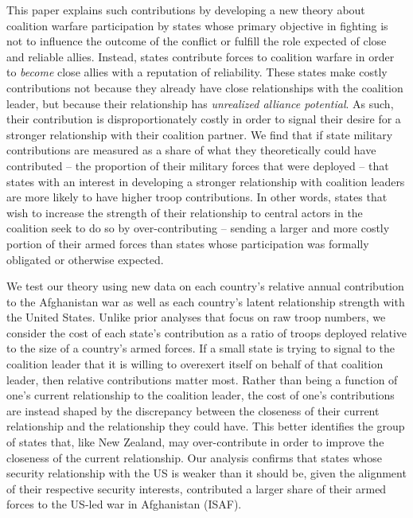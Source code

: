 \documentclass[12pt,letterpaper]{article}
\begin{document}
	This paper explains such contributions by developing a new theory about coalition warfare participation by states whose primary objective in fighting is not to influence the outcome of the conflict or fulfill the role expected of close and reliable allies. Instead, states contribute forces to coalition warfare in order to \textit{become} close allies with a reputation of reliability. These states make costly contributions not because they already have close relationships with the coalition leader, but because their relationship has \textit{unrealized alliance potential}. As such, their contribution is disproportionately costly in order to signal their desire for a stronger relationship with their coalition partner. We find that if state military contributions are measured as a share of what they theoretically could have contributed -- the proportion of their military forces that were deployed -- that states with an interest in developing a stronger relationship with coalition leaders are more likely to have higher troop contributions. In other words, states that wish to increase the strength of their relationship to central actors in the coalition seek to do so by over-contributing -- sending a larger and more costly portion of their armed forces than states whose participation was formally obligated or otherwise expected.
	
	We test our theory using new data on each country's relative annual contribution to the Afghanistan war as well as each country's latent relationship strength with the United States. Unlike prior analyses that focus on raw troop numbers, we consider the cost of each state's contribution as a ratio of troops deployed relative to the size of a country's armed forces. If a small state is trying to signal to the coalition leader that it is willing to overexert itself on behalf of that coalition leader, then relative contributions matter most. Rather than being a function of one's current relationship to the coalition leader, the cost of one's contributions are instead shaped by the discrepancy between the closeness of their current relationship and the relationship they could have. This better identifies the group of states that, like New Zealand, may over-contribute in order to improve the closeness of the current relationship. Our analysis confirms that states whose security relationship with the US is weaker than it should be, given the alignment of their respective security interests, contributed a larger share of their armed forces to the US-led war in Afghanistan (ISAF).
	
\end{document}
